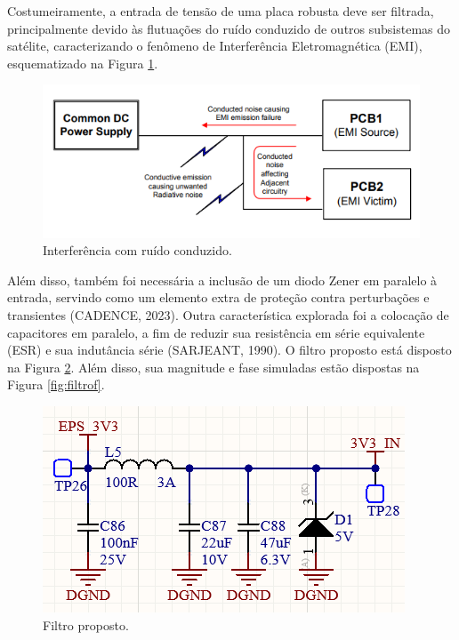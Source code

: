 Costumeiramente, a entrada de tensão de uma placa robusta deve ser filtrada, principalmente devido às flutuações do ruído conduzido de outros subsistemas do satélite, caracterizando o fenômeno de Interferência Eletromagnética (EMI), esquematizado na Figura \ref{fig:emi}.

\begin{figure}[H]
    \centering
    \includegraphics[scale=1]{images/EMI noise.png}
    \caption{Interferência com ruído conduzido.}
    \label{fig:emi}
\end{figure}

Além disso, também foi necessária a inclusão de um diodo Zener em paralelo à entrada, servindo como um elemento extra de proteção contra perturbações e transientes (CADENCE, 2023). Outra característica explorada foi a colocação de capacitores em paralelo, a fim de reduzir sua resistência em série equivalente (ESR) e sua indutância série (SARJEANT, 1990).  O filtro proposto está disposto na Figura \ref{fig:FILTRO}.  Além disso, sua magnitude e fase simuladas estão dispostas na Figura \ref{fig:filtrof}.

\begin{figure}[H]
    \centering
    \includegraphics[scale=1]{images/FILTRO.png}
    \caption{Filtro proposto.}
    \label{fig:FILTRO}
\end{figure}

